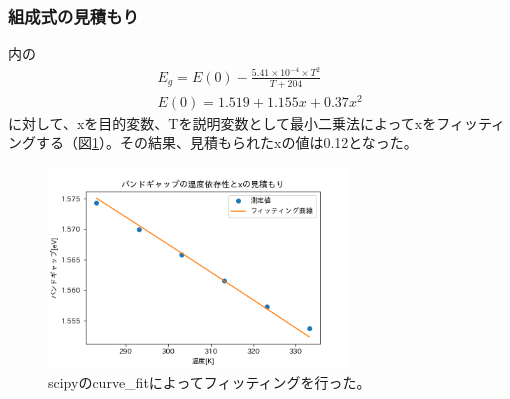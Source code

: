 \documentclass[titlepage]{jsarticle}
\begin{document}
\subsubsection{組成式の見積もり}
\cite{datasheet}内の
\begin{align}
    \label{E_g}
    E_g=E(0)-\frac{5.41\times10^{-4}\times T^2}{T+204}\\
    E(0)=1.519+1.155x+0.37x^2
    \label{E_0}
\end{align}
に対して、xを目的変数、Tを説明変数として最小二乗法によってxをフィッティングする（図\ref{fig:stimulate_x}）。その結果、見積もられたxの値は0.12となった。
\begin{figure}[htbp]
 \begin{minipage}{0.5\hsize}
  \begin{center}
   \includegraphics[width=80mm]{stimulate_x.png}
  \end{center}
  \caption{scipyのcurve\_fitによってフィッティングを行った。}
  \label{fig:stimulate_x} \end{minipage}
\end{figure}
\end{document}
